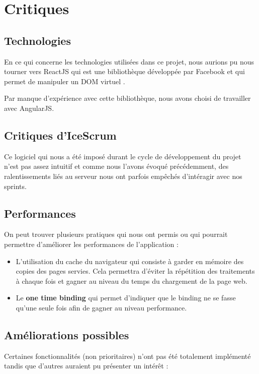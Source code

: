 \documentclass [a4paper,11pt]{article}
\begin{document}
\newpage

\section{Critiques}

\subsection{Technologies}
En ce qui concerne les technologies utilisées dans ce projet, nous aurions pu nous tourner vers ReactJS qui est une bibliothèque développée par Facebook et qui permet de manipuler un DOM virtuel \cite{reactjs}.
\newline

Par manque d'expérience avec cette bibliothèque, nous avons choisi de travailler avec AngularJS.

\subsection{Critiques d'IceScrum}
Ce logiciel qui nous a été imposé durant le cycle de développement du projet n'est pas assez intuitif et comme nous l'avons évoqué précédemment, des ralentissements liés au serveur nous ont parfois empêchés d'intéragir avec nos sprints.

\subsection{Performances}
On peut trouver plusieurs pratiques qui nous ont permis ou qui pourrait permettre d’améliorer les performances de l’application :
\newline

\begin{itemize}
\item L’utilisation du cache du navigateur qui consiste à garder en mémoire des copies des pages servies. Cela permettra d’éviter la répétition des traitements à chaque fois et gagner au niveau du temps du chargement de la page web.\newline
\item Le \textbf{one time binding} qui permet d’indiquer que le binding ne se fasse qu’une seule fois afin de gagner au niveau performance.
\end{itemize}

\subsection{Améliorations possibles}
Certaines fonctionnalités (non prioritaires) n'ont pas été totalement implémenté tandis que d'autres auraient pu présenter un intérêt : \newline
\end{document}
